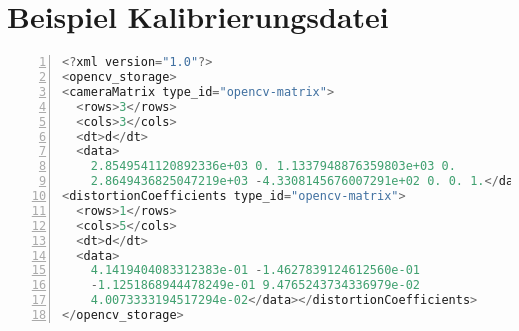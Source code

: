 \section{Beispiel Kalibrierungsdatei}\label{appendix:opencv_filestorage_example}
\begin{lstlisting}[language=c++, numbers=left, breaklines=true, breakatwhitespace=false]
<?xml version="1.0"?>
<opencv_storage>
<cameraMatrix type_id="opencv-matrix">
  <rows>3</rows>
  <cols>3</cols>
  <dt>d</dt>
  <data>
    2.8549541120892336e+03 0. 1.1337948876359803e+03 0.
    2.8649436825047219e+03 -4.3308145676007291e+02 0. 0. 1.</data></cameraMatrix>
<distortionCoefficients type_id="opencv-matrix">
  <rows>1</rows>
  <cols>5</cols>
  <dt>d</dt>
  <data>
    4.1419404083312383e-01 -1.4627839124612560e-01
    -1.1251868944478249e-01 9.4765243734336979e-02
    4.0073333194517294e-02</data></distortionCoefficients>
</opencv_storage>
\end{lstlisting}